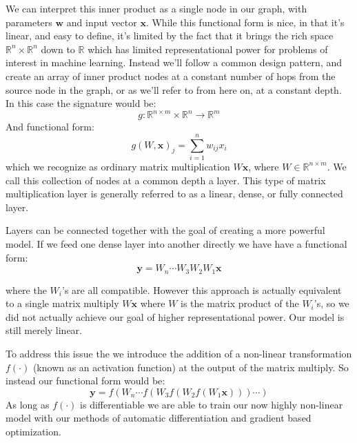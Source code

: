 We can interpret this inner product as a single node in our graph, with
parameters $\mathbf{w}$ and input vector $\mathbf{x}$. While this functional
form is nice, in that it's linear, and easy to define, it's limited by the
fact that it brings the rich space $\mathbb{R}^n \times \mathbb{R}^n$ down to
$\mathbb{R}$ which has limited representational power for problems of interest
in machine learning. Instead we'll follow a common design pattern, and create
an array of inner product nodes at a constant number of hops from the source node
in the graph, or as we'll refer to from here on, at a constant depth. In this case the signature would be:
\begin{equation}
g \colon \mathbb{R}^{n \times m} \times \mathbb{R}^n \to \mathbb{R}^m
\end{equation}
And functional form:
\begin{equation}
g\left(W, \mathbf{x}\right)_j = \sum\limits_{i=1}^n w_{ij}x_i
\end{equation}
which we recognize as ordinary matrix multiplication $W\mathbf{x}$, where $W
\in \mathbb{R}^{n \times m}$. We call this collection of nodes at a common
depth a layer. This type of matrix multiplication layer is generally referred to
as a linear, dense, or fully connected layer.

Layers can be connected together with the goal of creating a more powerful model. 
If we feed one dense layer into another directly we have have a functional form:
\begin{equation}
\mathbf{y} = W_n \cdots W_3W_2W_1\mathbf{x}
\end{equation}

where the $W_i$'s are all compatible. However this approach is actually
equivalent to a single matrix multiply $W\mathbf{x}$ where $W$ is the matrix
product of the $W_i$'s, so we did not actually achieve our goal of higher
representational power. Our model is still merely linear.

To address this issue the we introduce the addition of a non-linear
transformation $f(\cdot)$ (known as an activation function) at the output of
the matrix multiply. So instead our functional form would be:
\begin{equation}
\mathbf{y} = f(W_n \cdots f(W_3f(W_2f(W_1\mathbf{x})))\cdots)
\end{equation}
As long as $f(\cdot)$ is differentiable we are able to train our now highly
non-linear model with our methods of automatic differentiation and gradient
based optimization.

